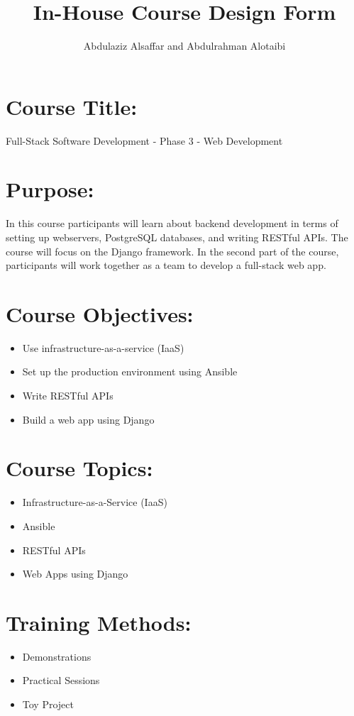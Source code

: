 \documentclass[a4paper,11pt]{article}
\author{Abdulaziz Alsa{f}far and Abdulrahman Alotaibi}
\title{In-House Course Design Form}
\begin{document}
\maketitle
\pagestyle{plain}
\setcounter{page}{1}

\section{Course Title:}
Full-Stack Software Development - Phase 3 - Web Development

\section{Purpose:}
In this course participants will learn about backend development in terms of setting up webservers, PostgreSQL databases, and writing RESTful APIs. The course will focus on the Django framework. In the second part of the course, participants will work together as a team to develop a full-stack web app.

\section{Course Objectives:}
\begin{itemize}
	\item Use infrastructure-as-a-service (IaaS)
	\item Set up the production environment using Ansible
	\item Write RESTful APIs
	\item Build a web app using Django	
\end{itemize}

\section{Course Topics:}
\begin{itemize}
	\item Infrastructure-as-a-Service (IaaS)
	\item Ansible
	\item RESTful APIs
	\item Web Apps using Django
\end{itemize}

\section{Training Methods:}
\begin{itemize}
	\item Demonstrations
	\item Practical Sessions
	\item Toy Project
\end{itemize}
\end{document}
